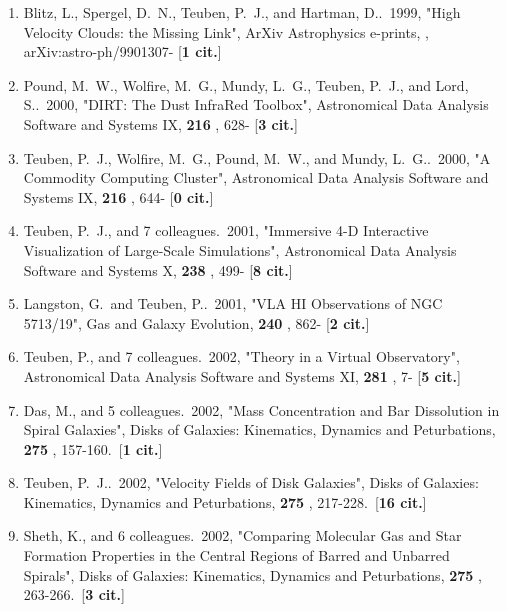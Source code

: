 \documentclass[11pt,letterpaper]{article}
\begin{document}
\begin{enumerate}[resume,label=\textbf{\arabic*}.]
\item  
Blitz, L., Spergel, D.~N., Teuben, P.~J., and Hartman, D..\  1999,  "High 
Velocity Clouds: the Missing Link", ArXiv Astrophysics e-prints,  , 
arXiv:astro-ph/9901307- [{\bf 1 cit.}] 

\item  
Pound, M.~W., Wolfire, M.~G., Mundy, L.~G., Teuben, P.~J., and Lord, S..\  
2000,  "DIRT: The Dust InfraRed Toolbox", Astronomical Data Analysis 
Software and Systems IX,  {\bf 216} , 628- [{\bf 3 cit.}] 

\item  
Teuben, P.~J., Wolfire, M.~G., Pound, M.~W., and Mundy, L.~G..\  2000,  "A 
Commodity Computing Cluster", Astronomical Data Analysis Software and 
Systems IX,  {\bf 216} , 644- [{\bf 0 cit.}] 



\item  
Teuben, P.~J., and 7 colleagues.\  2001,  "Immersive 4-D Interactive 
Visualization of Large-Scale Simulations", Astronomical Data Analysis 
Software and Systems X,  {\bf 238} , 499- [{\bf 8 cit.}] 

\item  
Langston, G.~and Teuben, P..\  2001,  "VLA HI Observations of NGC 5713/19", 
Gas and Galaxy Evolution,  {\bf 240} , 862- [{\bf 2 cit.}] 



\item  
Teuben, P., and 7 colleagues.\  2002,  "Theory in a Virtual Observatory", 
Astronomical Data Analysis Software and Systems XI,  {\bf 281} , 7- [{\bf 5 
cit.}] 


\item  
Das, M., and 5 colleagues.\  2002,  "Mass Concentration and Bar Dissolution 
in Spiral Galaxies", Disks of Galaxies: Kinematics, Dynamics and 
Peturbations,  {\bf 275} , 157-160.\  [{\bf 1 cit.}] 

\item  
Teuben, P.~J..\  2002,  "Velocity Fields of Disk Galaxies", Disks of 
Galaxies: Kinematics, Dynamics and Peturbations,  {\bf 275} , 217-228.\  
[{\bf 16 cit.}] 

\item  
Sheth, K., and 6 colleagues.\  2002,  "Comparing Molecular Gas and Star 
Formation Properties in the Central Regions of Barred and Unbarred 
Spirals", Disks of Galaxies: Kinematics, Dynamics and Peturbations,  {\bf 
275} , 263-266.\  [{\bf 3 cit.}] 


\end{enumerate}
\end{document}
